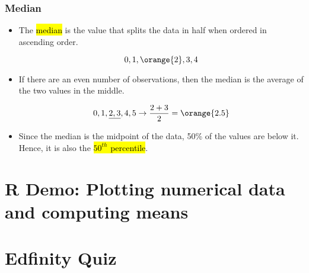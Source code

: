 \documentclass[slidestop,compress,mathserif]{beamer}
\begin{document}
\begin{frame}
\frametitle{Median}

\begin{itemize}

\item The \hl{median} is the value that splits the data in half when ordered in ascending order.

\[ 0,1,\orange{2},3,4 \]

\item If there are an even number of observations, then the median is the average of the two values in the middle.

\[ 0,1,\underline{2,3},4,5 \rightarrow \frac{2 + 3}{2} = \orange{2.5} \]

\item Since the median is the midpoint of the data, 50\% of the values are below it. Hence, it is also the \hl{$50^{th}$ percentile}.

\end{itemize}

\end{frame}



\section{R Demo: Plotting numerical data and computing means}

\section{Edfinity Quiz}




\end{document}

